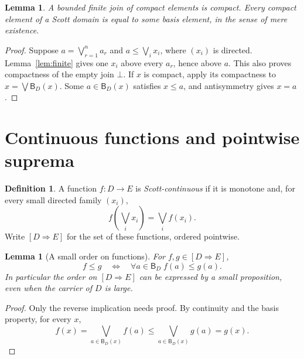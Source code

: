 \documentclass[11pt,a4paper]{article}
\newtheorem{lemma}[theorem]{Lemma}
\theoremstyle{definition}
\newtheorem{definition}[theorem]{Definition}
\theoremstyle{remark}
\newcommand{\B}{\mathsf B}
\newcommand{\Cont}[2]{[#1\mathbin{\Rightarrow}#2]}
\newcommand{\lub}{\bigvee}
\begin{document}
\begin{lemma}\label{lem:compactjoins}
A bounded finite join of compact elements is compact. Every compact
element of a Scott domain is equal to some basis element, in the sense
of mere existence.
\end{lemma}
\begin{proof}
Suppose $a=\lub_{r=1}^n a_r$ and $a\leq\lub_i x_i$, where $(x_i)$ is
directed. Lemma~\ref{lem:finite} gives one $x_i$ above every $a_r$, hence
above $a$. This also proves compactness of the empty join $\bot$.
If $x$ is compact, apply its compactness to
$x=\lub\B_D(x)$. Some $a\in\B_D(x)$ satisfies $x\leq a$, and
antisymmetry gives $x=a$.
\end{proof}

\section{Continuous functions and pointwise suprema}

\begin{definition}
A function $f:D\to E$ is \emph{Scott-continuous} if it is monotone and,
for every small directed family $(x_i)$,
\[
 f\left(\lub_i x_i\right)=\lub_i f(x_i).
\]
Write $\Cont D E$ for the set of these functions, ordered pointwise.
\end{definition}

\begin{lemma}[A small order on functions]\label{lem:smallorder}
For $f,g\in\Cont D E$,
\[
 f\leq g
 \quad\Longleftrightarrow\quad
 \forall a\in\B_D\; f(a)\leq g(a).
\]
In particular the order on $\Cont D E$ can be expressed by a small
proposition, even when the carrier of $D$ is large.
\end{lemma}
\begin{proof}
Only the reverse implication needs proof. By continuity and the basis
property, for every $x$,
\[
 f(x)=\lub_{a\in\B_D(x)} f(a)
 \leq\lub_{a\in\B_D(x)} g(a)=g(x).
\]
\end{proof}
\end{document}
